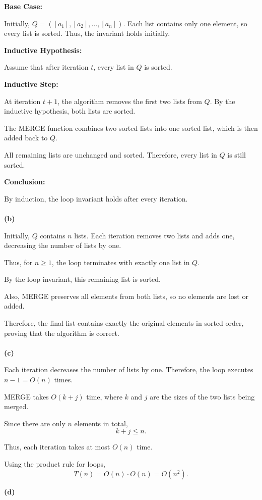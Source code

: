 \documentclass[10pt,letterpaper,unboxed,cm]{article}
\begin{document}
\begin{enumerate}
\textbf{Base Case:}

Initially, $Q=([a_1],[a_2],\dots,[a_n])$.
Each list contains only one element, so every list
is sorted. Thus, the invariant holds initially.

\textbf{Inductive Hypothesis:}

Assume that after iteration $t$, every list in
$Q$ is sorted.

\textbf{Inductive Step:}

At iteration $t+1$, the algorithm removes the first
two lists from $Q$. By the inductive hypothesis,
both lists are sorted.

The MERGE function combines two sorted lists into
one sorted list, which is then added back to $Q$.

All remaining lists are unchanged and sorted.
Therefore, every list in $Q$ is still sorted.

\textbf{Conclusion:}

By induction, the loop invariant holds after
every iteration.\\
\\
\textbf{(b)}

Initially, $Q$ contains $n$ lists. Each iteration
removes two lists and adds one, decreasing the
number of lists by one.

Thus, for $n \geq 1$, the loop terminates with
exactly one list in $Q$.

By the loop invariant, this remaining list is sorted.

Also, MERGE preserves all elements from both lists,
so no elements are lost or added.

Therefore, the final list contains exactly the
original elements in sorted order, proving that
the algorithm is correct.\\
\\

\textbf{(c)}

Each iteration decreases the number of lists by one.
Therefore, the loop executes $n-1=O(n)$ times.

MERGE takes $O(k+j)$ time, where $k$ and $j$ are
the sizes of the two lists being merged.

Since there are only $n$ elements in total,
\[k+j \leq n.\]

Thus, each iteration takes at most $O(n)$ time.

Using the product rule for loops,
\[T(n)=O(n)\cdot O(n)=\boxed{O(n^2)}.\]

\textbf{(d)}


\end{enumerate}
\end{document}

